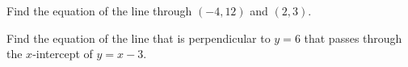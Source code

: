 \documentclass[12pt,letterpaper]{exam}
\begin{document}
\begin{questions}
\newpage



\question[8] Find the equation of the line through $(-4, 12)$ and $(2, 3)$.



\newpage



\question[8] Find the equation of the line that is perpendicular to $y= 6$ that passes through the $x$-intercept of $y= x - 3$. 






\end{questions}
\end{document}
